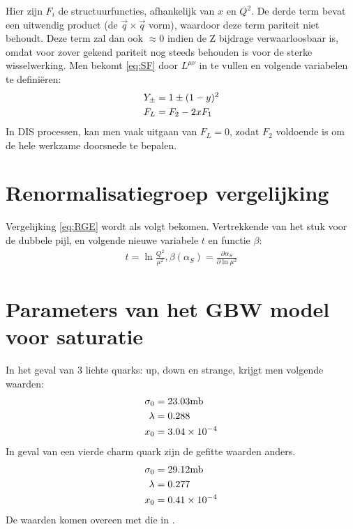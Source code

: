 \documentclass[a4paper,11pt]{article}
\numberwithin{equation}{section} %
\begin{document}
Hier zijn $F_i$ de structuurfuncties, afhankelijk van $x$ en $Q^2$.
De derde term bevat een uitwendig product (de $\vec{q} \times \vec{q}$ vorm), waardoor deze term pariteit niet behoudt.
Deze term zal dan ook $\approx 0$ indien de Z bijdrage verwaarloosbaar is, omdat voor zover gekend pariteit nog steeds behouden is voor de sterke wisselwerking.
Men bekomt \eqref{eq:SF} door $L^{\mu \nu}$ in te vullen en volgende variabelen te definiëren:
\begin{align}
Y_\pm &= 1 \pm (1-y)^2 \notag \\
F_L &= F_2 - 2x F_1 \notag
\end{align}
In DIS processen, kan men vaak uitgaan van $F_L = 0$, zodat $F_2$ voldoende is om de hele werkzame doorsnede te bepalen.

\section{Renormalisatiegroep vergelijking} \label{app:RGE}
Vergelijking \eqref{eq:RGE} wordt als volgt bekomen. Vertrekkende van het stuk voor de dubbele pijl, en volgende nieuwe variabele $t$ en functie $\beta$:
\begin{align}
t = \ln{\frac{Q^2}{\mu^2}}, \beta(\alpha_S) =  \frac{\partial \alpha_S}{\partial \ln{\mu^2}}
\end{align}

\section{Parameters van het GBW model voor saturatie} \label{app:GBWparameters}
In het geval van 3 lichte quarks: up, down en strange, krijgt men volgende waarden:
\begin{align}
\sigma_0 &= 23.03 \text{mb} \notag \\
\lambda &= 0.288 \\
x_0 &= 3.04 \times 10^{-4} \notag
\end{align}
In geval van een vierde charm quark zijn de gefitte waarden anders.
\begin{align}
\sigma_0 &= 29.12 \text{mb} \notag \\
\lambda &= 0.277 \\
x_0 &= 0.41 \times 10^{-4} \notag
\end{align}
De waarden komen overeen met die in \cite{GBW}.
\end{document}

